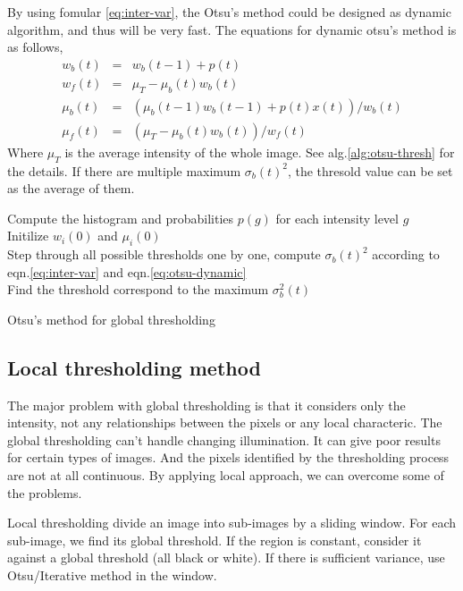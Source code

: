 By using fomular \ref{eq:inter-var}, the Otsu's method could be designed as dynamic algorithm, and thus will be very fast. The equations for dynamic otsu's method is as follows, 
\begin{equation} \label{eq:otsu-dynamic}
\begin{array}{lll}
	w_b(t) & = & w_b(t-1) + p(t) \\
	w_f(t) & = & \mu_T - \mu_b(t)w_b(t) \\
	\mu_b(t) & = & (\mu_b(t-1)w_b(t-1) + p(t)x(t))/w_b(t)\\
	\mu_f(t) & = & (\mu_T - \mu_b(t)w_b(t))/w_f(t)
\end{array}
\end{equation}
Where $\mu_T$ is the average intensity of the whole image. See alg.\ref{alg:otsu-thresh} for the details. If there are multiple maximum $\sigma_b(t)^2$, the thresold value can be set as the average of them.
\begin{algorithm}
\SetAlgoLined
{}
Compute the histogram and probabilities $p(g)$ for each intensity level $g$\\
Initilize $w_i(0)$ and $\mu_i(0)$\\
Step through all possible thresholds one by one, compute $\sigma_b(t)^2$ according to eqn.\ref{eq:inter-var} and eqn.\ref{eq:otsu-dynamic}\\
Find the threshold correspond to the maximum $\sigma_b^2(t)$
\caption{Otsu's method for global thresholding}
\label{alg:otsu-thresh}
\end{algorithm}
\subsection{Local thresholding method}
The major problem with global thresholding is that it considers only the intensity, not any relationships between the pixels or any local characteric. The global thresholding can't handle changing illumination. It can give poor results for certain types of images. And the pixels identified by the thresholding process are not at all continuous. By applying local approach, we can overcome some of the problems.

Local thresholding divide an image into sub-images by a sliding window. For each sub-image, we find its global threshold. If the region is constant, consider it against a global threshold (all black or white). If there is sufficient variance, use Otsu/Iterative method in the window. 

